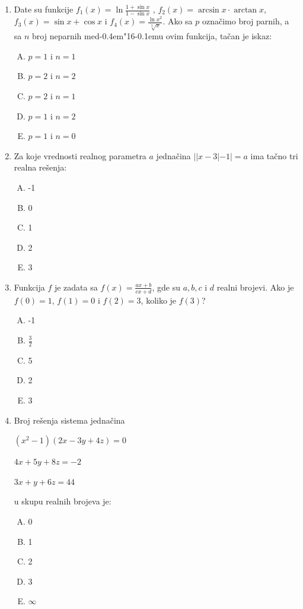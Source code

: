 \documentclass[a4paper,12pt]{report}
\def\dj{d\kern-0.4em\char"16\kern-0.1em}
\begin{document}
\begin{enumerate}[1.]
\item Date su funkcije  $ f_1(x) = \ln \frac{1 + \sin{x}}{1 - \sin{x}}$ , $ f_2(x) = \arcsin{x} \cdot \arctan{x} $, $ f_3(x) = \sin{x} + \cos{x} $ i $f_4(x) = \frac{\ln{x^2}}{\sqrt[3]{x}} $. Ako sa $p$ ozna\v{c}imo broj parnih, a sa $n$ broj neparnih me\dj{}u ovim funkcija, ta\v{c}an je iskaz:
\begin{multicols}{3}
\begin{enumerate}[A)]
\item $p = 1$ i $n = 1$ \item $p = 2$ i $n = 2$ \item $p = 2$ i $n = 1$ \item $p = 1$ i $n = 2$ \item $p = 1$ i $n = 0$
\end{enumerate}
\end{multicols}



\item Za koje vrednosti realnog parametra $a$ jedna\v{c}ina $||x-3|-1|=a$ ima ta\v{c}no tri realna re\v{s}enja:
\begin{multicols}{5}
\begin{enumerate}[A)]
\item -1 \item 0 \item 1 \item 2 \item 3
\end{enumerate}
\end{multicols}


\item Funkcija $f$ je zadata sa $f(x) = \frac{ax +b}{cx+d} $, gde su $a,b,c$ i $d$ realni brojevi. Ako je $f(0) = 1$,  $f(1) = 0$ i  $f(2) = 3$, koliko je  $f(3)$?
\begin{multicols}{5}
\begin{enumerate}[A)]
\item -1 \item $\frac{3}{2}$ \item 5 \item 2 \item 3
\end{enumerate}
\end{multicols}


\item Broj re\v{s}enja sistema jedna\v{c}ina 
\par $(x^{2} - 1)(2x -3y + 4z) = 0$
\par $4x + 5y +8z = -2$
\par $3x + y + 6z = 44$
\par u skupu realnih brojeva je: 
\begin{multicols}{5}
\begin{enumerate}[A)]
\item 0 \item 1 \item 2 \item 3 \item $\infty$
\end{enumerate}
\end{multicols}


\end{enumerate}
\end{document}
